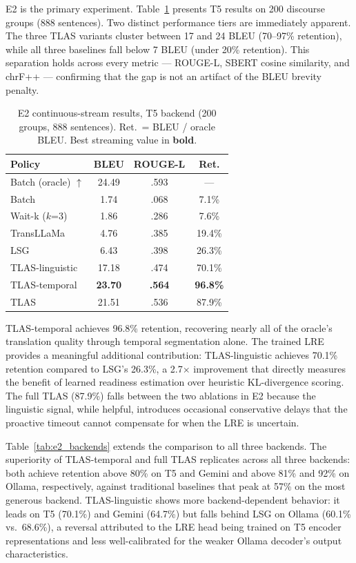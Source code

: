 \documentclass[conference]{IEEEtran}
\begin{document}
E2 is the primary experiment. Table~\ref{tab:e2_t5} presents T5 results on 200 discourse groups (888 sentences). Two distinct performance tiers are immediately apparent. The three TLAS variants cluster between 17 and 24 BLEU (70--97\% retention), while all three baselines fall below 7 BLEU (under 20\% retention). This separation holds across every metric — ROUGE-L, SBERT cosine similarity, and chrF++ — confirming that the gap is not an artifact of the BLEU brevity penalty.

\begin{table}[t]
\centering
\caption{E2 continuous-stream results, T5 backend (200 groups, 888 sentences). Ret.\ = BLEU / oracle BLEU. Best streaming value in \textbf{bold}.}
\label{tab:e2_t5}
\small
\begin{tabular}{lccc}
\toprule
\textbf{Policy} & \textbf{BLEU} & \textbf{ROUGE-L} & \textbf{Ret.} \\
\midrule
Batch (oracle) $\uparrow$ & 24.49 & .593 & --- \\
\midrule
Batch             &  1.74 & .068 &  7.1\% \\
Wait-k ($k$=3)    &  1.86 & .286 &  7.6\% \\
TransLLaMa        &  4.76 & .385 & 19.4\% \\
\midrule
LSG               &  6.43 & .398 & 26.3\% \\
TLAS-linguistic   & 17.18 & .474 & 70.1\% \\
TLAS-temporal     & \textbf{23.70} & \textbf{.564} & \textbf{96.8\%} \\
TLAS              & 21.51 & .536 & 87.9\% \\
\bottomrule
\end{tabular}
\end{table}

TLAS-temporal achieves 96.8\% retention, recovering nearly all of the oracle's translation quality through temporal segmentation alone. The trained LRE provides a meaningful additional contribution: TLAS-linguistic achieves 70.1\% retention compared to LSG's 26.3\%, a 2.7$\times$ improvement that directly measures the benefit of learned readiness estimation over heuristic KL-divergence scoring. The full TLAS (87.9\%) falls between the two ablations in E2 because the linguistic signal, while helpful, introduces occasional conservative delays that the proactive timeout cannot compensate for when the LRE is uncertain.

Table~\ref{tab:e2_backends} extends the comparison to all three backends. The superiority of TLAS-temporal and full TLAS replicates across all three backends: both achieve retention above 80\% on T5 and Gemini and above 81\% and 92\% on Ollama, respectively, against traditional baselines that peak at 57\% on the most generous backend. TLAS-linguistic shows more backend-dependent behavior: it leads on T5 (70.1\%) and Gemini (64.7\%) but falls behind LSG on Ollama (60.1\% vs.\ 68.6\%), a reversal attributed to the LRE head being trained on T5 encoder representations and less well-calibrated for the weaker Ollama decoder's output characteristics.
\end{document}

